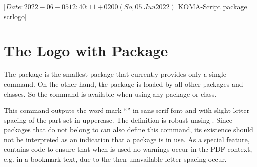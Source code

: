 %
%
%
%
%
%
%

                 [$Date: 2022-06-05 12:40:11 +0200 (So, 05. Jun 2022) $
                  KOMA-Script package scrlogo]


\chapter{The \KOMAScript{} Logo with Package }
\BeginIndexGroup
{}%

The  package is the smallest \KOMAScript{} package that
currently provides only a single command. On the other hand, the package
is loaded by all other \KOMAScript{} packages and \KOMAScript{} classes. So
the command is available when using any \KOMAScript{} package or
\KOMAScript{} class.

\begin{Declaration}
\end{Declaration}
This command outputs the word mark ``\KOMAScript'' in sans-serif font and with
slight letter spacing of the part set in uppercase. The definition is robust
unsing . Since packages that do not belong to
\KOMAScript{} can also define this command, its existence should not be
interpreted as an indication that a \KOMAScript{} package is in use. As a
special feature, 
contains code to ensure that when
 is
used no warnings occur in the PDF context, e.g. in a bookmark text, due to
the then unavailable letter spacing occur.%
\EndIndexGroup
\EndIndexGroup
\endinput
                  
